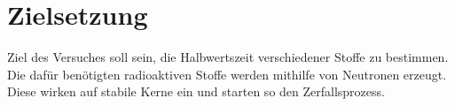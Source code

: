 \section{Zielsetzung}
\label{sec:zielsetzung}

Ziel des Versuches soll sein, die Halbwertszeit verschiedener Stoffe zu bestimmen.
Die dafür benötigten radioaktiven Stoffe werden mithilfe von Neutronen erzeugt.
Diese wirken auf stabile Kerne ein und starten so den Zerfallsprozess.
